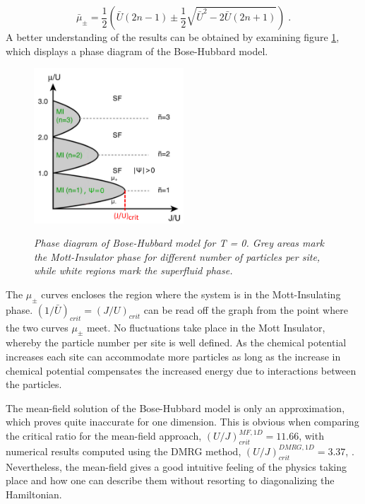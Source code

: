 \begin{equation}
	\bar{\mu}_{\pm} = \frac{1}{2} \left( \bar{U}(2n -1) \pm \frac{1}{2} \sqrt{\bar{U}^2 - 2 \bar{U} (2 n +1)} \right) \; .
\end{equation}
A better understanding of the results can be obtained by examining figure \ref{fig:SFMOTT}, which displays a phase diagram of the Bose-Hubbard model.  
\begin{figure}[h]
	\centering
	\includegraphics[width = 0.5\textwidth]{Figures/SFMottPhase.pdf}
	\label{fig:SFMOTT}
	\caption{\textit{Phase diagram of Bose-Hubbard model for T = 0. Grey areas mark the Mott-Insulator phase for different number of particles per site, while white regions mark the superfluid phase. \cite{greiner}}}
\end{figure}
The $\mu_{\pm}$ curves encloses the region where the system is in the Mott-Insulating phase. $(1/\bar{U})_{crit} = (J/U)_{crit}$ can be read off the graph from the point where the two curves $\mu_{\pm}$ meet. No fluctuations take place in the Mott Insulator, whereby the particle number per site is well defined. As the chemical potential increases each site can accommodate more particles as long as the increase in chemical potential compensates the increased energy due to interactions between the particles.

The mean-field solution of the Bose-Hubbard model is only an approximation, which proves quite inaccurate for one dimension. This is obvious when comparing the critical ratio for the mean-field approach, $\left( U/J \right)_{crit}^{MF,1D} = 11.66$, with numerical results computed using the DMRG method, $\left( U/J \right)_{crit}^{DMRG,1D} = 3.37$, \cite{Kuhner2000}. Nevertheless, the mean-field gives a good intuitive feeling of the physics taking place and how one can describe them without resorting to diagonalizing the Hamiltonian.


